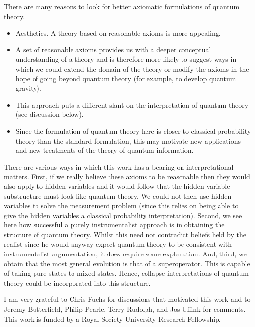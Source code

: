 \documentclass[10pt,twocolumn]{article}
\begin{document}
There are many reasons to look for better axiomatic formulations of
quantum theory.
\begin{itemize}
\item Aesthetics.  A theory based on reasonable axioms is more
appealing.
\item A set of reasonable axioms provides us with a deeper conceptual
understanding of a theory and is therefore more likely to suggest ways
in which we could extend the domain of the theory or modify the axioms
in the hope of going beyond quantum theory (for example, to develop
quantum gravity).
\item This approach puts a different slant on the interpretation
of quantum theory (see discussion below).
\item  Since the formulation of quantum theory here is closer to
classical probability theory than the standard formulation, this may
motivate new applications and new treatments of the theory of quantum
information.
\end{itemize}

There are various ways in which this work has a bearing on
interpretational matters.  First, if we really believe these axioms to
be reasonable then they would also apply to hidden variables and it
would follow that the hidden variable substructure must look
like quantum theory.  We could not then use hidden variables to solve
the measurement problem (since this relies on being able to give the
hidden variables a classical probability interpretation).
Second, we see here how successful a purely instrumentalist approach is
in obtaining the structure of quantum theory. Whilst this need not contradict
beliefs held by the realist since he would anyway expect quantum theory
to be consistent with instrumentalist argumentation, it does require
some explanation.  And, third, we obtain that the most general evolution
is that of a
superoperator.  This is capable of taking pure states to mixed states.
Hence, collapse interpretations of quantum theory could be incorporated
into this structure.

\vspace{6mm}


\vspace{6mm}

I am very grateful to Chris Fuchs for discussions that motivated this
work and to Jeremy Butterfield, Philip Pearle, Terry Rudolph, and Jos
Uffink for comments. This work is funded by a Royal Society University
Research Fellowship.
\end{document}
